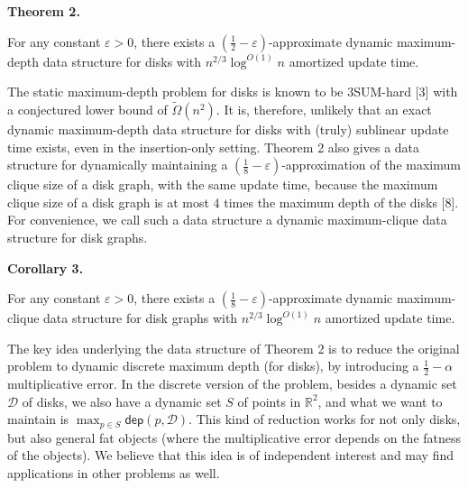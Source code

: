 \documentclass[10pt,a4paper]{article}
\begin{document}
\par\medskip\noindent\textbf{Theorem 2.}\par
For any constant $\varepsilon>0$, there exists a $(\frac{1}{2}-\varepsilon)$-approximate dynamic maximum-depth data structure for disks with $n^{2/3}\log^{O(1)}n$ amortized update time.
\par
\par
\par

The static maximum-depth problem for disks is known to be 3SUM-hard [3] with a conjectured lower bound of $\widetilde{\Omega}(n^{2})$. It is, therefore, unlikely that an exact dynamic maximum-depth data structure for disks with (truly) sublinear update time exists, even in the insertion-only setting. Theorem 2 also gives a data structure for dynamically maintaining a $(\frac{1}{8}-\varepsilon)$-approximation of the maximum clique size of a disk graph, with the same update time, because the maximum clique size of a disk graph is at most $4$ times the maximum depth of the disks [8]. For convenience, we call such a data structure a dynamic maximum-clique data structure for disk graphs.
\par
\par
\par\medskip\noindent\textbf{Corollary 3.}\par
For any constant $\varepsilon>0$, there exists a $(\frac{1}{8}-\varepsilon)$-approximate dynamic maximum-clique data structure for disk graphs with $n^{2/3}\log^{O(1)}n$ amortized update time.
\par
\par
\par
The key idea underlying the data structure of Theorem 2 is to reduce the original problem to dynamic discrete maximum depth (for disks), by introducing a $\frac{1}{2}-\alpha$ multiplicative error. In the discrete version of the problem, besides a dynamic set $\mathcal{D}$ of disks, we also have a dynamic set $S$ of points in $\mathbb{R}^{2}$, and what we want to maintain is $\max_{p\in S}\mathsf{dep}(p,\mathcal{D})$. This kind of reduction works for not only disks, but also general fat objects (where the multiplicative error depends on the fatness of the objects). We believe that this idea is of independent interest and may find applications in other problems as well.
\par
\par
\end{document}
